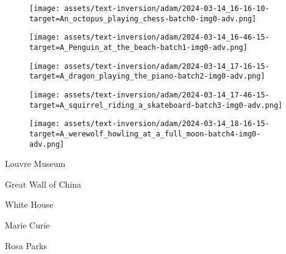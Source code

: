 \begin{figure*}[]
\begin{minipage}[t]{.025\textwidth}
     \vspace{0pt}
\end{minipage}%
\hspace{1ex}
\begin{minipage}[t]{0.98\figwidth}
    \vspace{0pt}
    \begin{subfigure}[t]{0.2\textwidth}
        \texttt{[image: assets/text-inversion/adam/2024-03-14\_16-16-10-target=An\_octopus\_playing\_chess-batch0-img0-adv.png]}
    \end{subfigure}%
    \begin{subfigure}[t]{0.2\textwidth}
        \texttt{[image: assets/text-inversion/adam/2024-03-14\_16-46-15-target=A\_Penguin\_at\_the\_beach-batch1-img0-adv.png]}
    \end{subfigure}%
    \begin{subfigure}[t]{0.2\textwidth}
        \texttt{[image: assets/text-inversion/adam/2024-03-14\_17-16-15-target=A\_dragon\_playing\_the\_piano-batch2-img0-adv.png]}
    \end{subfigure}%
    \begin{subfigure}[t]{0.2\textwidth}
        \texttt{[image: assets/text-inversion/adam/2024-03-14\_17-46-15-target=A\_squirrel\_riding\_a\_skateboard-batch3-img0-adv.png]}
    \end{subfigure}%
    \begin{subfigure}[t]{0.2\textwidth}
        \texttt{[image: assets/text-inversion/adam/2024-03-14\_18-16-15-target=A\_werewolf\_howling\_at\_a\_full\_moon-batch4-img0-adv.png]}
    \end{subfigure}%
\end{minipage}

\begin{minipage}[t]{.025\textwidth}
     \vspace{0pt}
\end{minipage}%
\hspace{1ex}%
\begin{minipage}[t]{0.98\figwidth}
    \vspace{1mm}
    \begin{minipage}[t]{0.2\textwidth}
        \centering
        Louvre Museum
    \end{minipage}%
    \begin{minipage}[t]{0.2\textwidth}
        \centering
        Great Wall of China
    \end{minipage}%
    \begin{minipage}[t]{0.2\textwidth}
        \centering
        White House
    \end{minipage}%
    \begin{minipage}[t]{0.2\textwidth}
        \centering
        Marie Curie
    \end{minipage}%
    \begin{minipage}[t]{0.2\textwidth}
        \centering
        Rosa Parks
    \end{minipage}%
\end{minipage}



\end{figure*}
